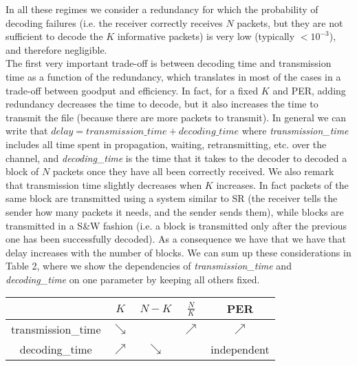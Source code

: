 In all these regimes we consider a redundancy for which the probability of decoding failures (i.e. the receiver correctly receives $N$ packets, but they are not sufficient to decode the $K$ informative packets) is very low (typically $<10^{-3}$), and therefore negligible. \\
The first very important trade-off is between decoding time and transmission time as a function of the redundancy, which translates in most of the cases in a trade-off between goodput and efficiency. In fact, for a fixed $K$ and PER, adding redundancy decreases the time to decode, but it also increases the time to transmit the file (because there are more packets to transmit). In general we can write that $delay=transmission\_time+decoding\_time$ where \emph{transmission\_time} includes all time spent in propagation, waiting, retransmitting, etc. over the channel, and \emph{decoding\_time} is the time that it takes to the decoder to decoded a block of $N$ packets once they have all been correctly received. We also remark that transmission time slightly decreases when $K$ increases. In fact packets of the same block are transmitted using a system similar to SR (the receiver tells the sender how many packets it needs, and the sender sends them), while blocks are transmitted in a S\&W fashion (i.e. a block is transmitted only after the previous one has been successfully decoded). As a consequence we have that we have that delay increases with the number of blocks. We can sum up these considerations in Table 2, where we show the dependencies of \emph{transmission\_time} and \emph{decoding\_time} on one parameter by keeping all others fixed.
\begin{center}
\begin{tabular}{c|c|c|c|c}

\toprule
&$K$&$N-K$&$\frac{N}{K}$&PER\\
\midrule
transmission\_time&$\searrow$& & $\nearrow$&$\nearrow$\\ \hline
decoding\_time&$\nearrow$&$\searrow$&&independent\\ 
\bottomrule
\end{tabular}
\end{center}

